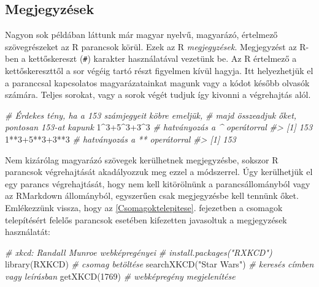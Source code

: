 \documentclass[
]{book}
\newenvironment{Shaded}{\begin{snugshade}}{\end{snugshade}}
\newcommand{\CommentTok}[1]{\textcolor[rgb]{0.56,0.35,0.01}{\textit{#1}}}
\newcommand{\DecValTok}[1]{\textcolor[rgb]{0.00,0.00,0.81}{#1}}
\newcommand{\FunctionTok}[1]{\textcolor[rgb]{0.00,0.00,0.00}{#1}}
\newcommand{\NormalTok}[1]{#1}
\newcommand{\SpecialCharTok}[1]{\textcolor[rgb]{0.00,0.00,0.00}{#1}}
\newcommand{\StringTok}[1]{\textcolor[rgb]{0.31,0.60,0.02}{#1}}
\begin{document}
\hypertarget{MegjegyzesazRben}{%
\subsection{Megjegyzések}\label{MegjegyzesazRben}}

Nagyon sok példában láttunk már magyar nyelvű, magyarázó, értelmező szövegrészeket az R parancsok körül. Ezek az R \emph{megjegyzések}. Megjegyzést az R-ben a kettőskereszt (\texttt{\#}) karakter használatával vezetünk be. Az R értelmező a kettőskereszttől a sor végéig tartó részt figyelmen kívül hagyja. Itt helyezhetjük el a paranccsal kapcsolatos magyarázatainkat magunk vagy a kódot később olvasók számára. Teljes sorokat, vagy a sorok végét tudjuk így kivonni a végrehajtás alól.

\begin{Shaded}
\begin{Highlighting}[]
\CommentTok{\# Érdekes tény, ha a 153 számjegyeit köbre emeljük, }
\CommentTok{\#   majd összeadjuk őket, pontosan 153{-}at kapunk}
\DecValTok{1}\SpecialCharTok{\^{}}\DecValTok{3}\SpecialCharTok{+}\DecValTok{5}\SpecialCharTok{\^{}}\DecValTok{3}\SpecialCharTok{+}\DecValTok{3}\SpecialCharTok{\^{}}\DecValTok{3}       \CommentTok{\# hatványozás a \^{} operátorral}
\CommentTok{\#\textgreater{} [1] 153}
\DecValTok{1}\SpecialCharTok{**}\DecValTok{3}\SpecialCharTok{+}\DecValTok{5}\SpecialCharTok{**}\DecValTok{3}\SpecialCharTok{+}\DecValTok{3}\SpecialCharTok{**}\DecValTok{3}    \CommentTok{\# hatványozás a ** operátorral}
\CommentTok{\#\textgreater{} [1] 153}
\end{Highlighting}
\end{Shaded}

Nem kizárólag magyarázó szövegek kerülhetnek megjegyzésbe, sokszor R parancsok végrehajtását akadályozzuk meg ezzel a módszerrel. Úgy kerülhetjük el egy parancs végrehajtását, hogy nem kell kitörölnünk a parancsállományból vagy az RMarkdown állományból, egyszerűen csak megjegyzésbe kell tennünk őket. Emlékezzünk vissza, hogy az \ref{Csomagoktelepitese}. fejezetben a csomagok telepítésért felelős parancsok esetében kifezetten javasoltuk a megjegyzések használatát:

\begin{Shaded}
\begin{Highlighting}[]
\CommentTok{\# xkcd: Randall Munroe webképregényei}
\CommentTok{\# install.packages("RXKCD")}
\FunctionTok{library}\NormalTok{(RXKCD)             }\CommentTok{\# csomag betöltése       }
\FunctionTok{searchXKCD}\NormalTok{(}\StringTok{"Star Wars"}\NormalTok{)    }\CommentTok{\# keresés címben vagy leírásban}
\FunctionTok{getXKCD}\NormalTok{(}\DecValTok{1769}\NormalTok{)              }\CommentTok{\# webképregény megjelenítése}
\end{Highlighting}
\end{Shaded}
\end{document}
